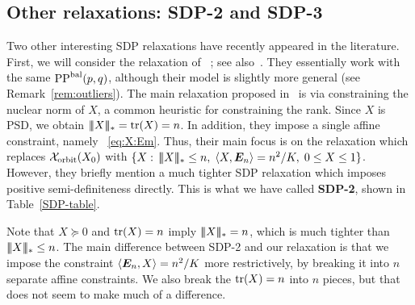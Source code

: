 \subsection{Other relaxations:  SDP-2 and SDP-3}
Two other interesting SDP relaxations have recently appeared in the
literature. First, we will consider the relaxation of
\ChenXu~\cite{Chen2014}; see also~\cite{Chen2012}. They essentially work with the same $\text{PP}^{\text{bal}}(p,q)$,
although their model is slightly more general (see
Remark~\ref{rem:outliers}). The main relaxation proposed
in~\cite{Chen2014} is via constraining the nuclear norm of $X$, a common heuristic for constraining the rank. Since $X$ is
PSD, we obtain $|\!|\!|X|\!|\!|_* = \operatorname*{tr}(X) = n$. In addition, they impose a
single affine constraint, namely ~\eqref{eq:X:Em}. Thus, their main
focus is on the relaxation which replaces $\mathcal{X}_{\text{orbit}}{(}X_0)$ with $\{X: \,
|\!|\!|X|\!|\!|_* \le n,\; \langle X,\bm{E}_n\rangle = n^2/K, \; 0 \le X \le 1\}$. However,
they briefly mention a much tighter SDP relaxation which imposes
positive semi-definiteness directly. This is what we have called {\bf SDP-2}, shown in Table~\ref{SDP-table}.

Note that $X \succeq 0$ and $\operatorname*{tr}(X) = n$ imply $|\!|\!|X|\!|\!|_* = n$, which is much tighter than $|\!|\!|X|\!|\!|_* \le n$.
The main difference between SDP-2 and our relaxation is that we impose the constraint $\langle \bm{E}_n,X\rangle = n^2/K$ more restrictively, by breaking it into $n$ separate affine constraints. We also break the $\operatorname*{tr}(X) = n$ into $n$ pieces, but that does not seem to make much of a difference.


